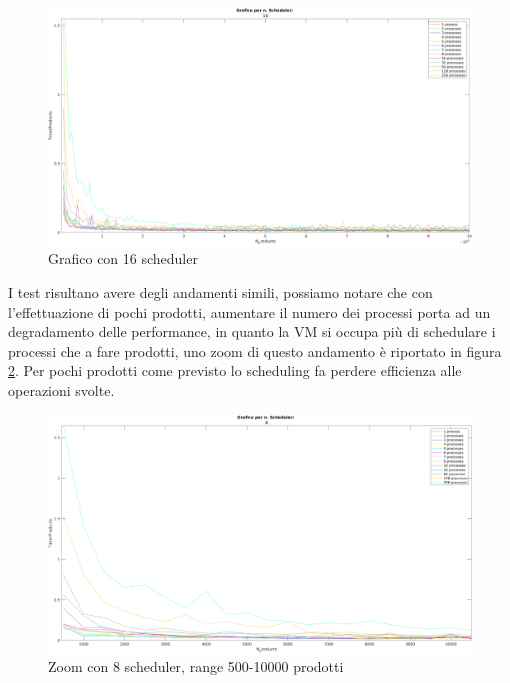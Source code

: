 \begin{figure}[!htp]
    \centering
    \includegraphics[keepaspectratio=true,scale=0.335]{images/matlab/16_scheduler.png}
	\caption{Grafico con 16 scheduler}
  	\label{fig:16_scheduler}
\end{figure}

I test risultano avere degli andamenti simili, possiamo notare che
con l'effettuazione di pochi prodotti, aumentare il numero dei processi
porta ad un degradamento delle performance, in quanto la VM si occupa più
di schedulare i processi che a fare prodotti, uno zoom di questo
andamento è riportato in figura \ref{fig:zoom_8_inizio}.
Per pochi prodotti come previsto lo scheduling fa perdere efficienza
alle operazioni svolte.
\begin{figure}[!htp]
    \centering
    \includegraphics[keepaspectratio=true,scale=0.335]{images/matlab/zoom_8_inizio.png}
	\caption{Zoom con 8 scheduler, range 500-10000 prodotti}
  	\label{fig:zoom_8_inizio}
\end{figure}

